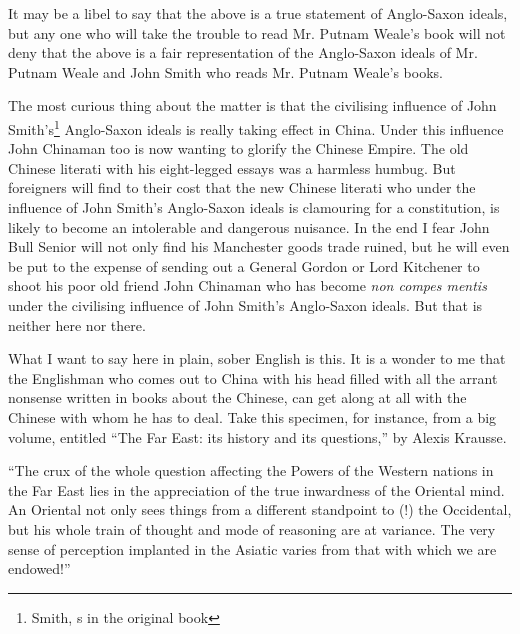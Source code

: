 It may be a libel to say that the above is a true statement of Anglo-Saxon ideals, but any one who will take the trouble to read Mr. Putnam Weale's book will not deny that the above is a fair representation of the Anglo-Saxon ideals of Mr. Putnam Weale and John Smith who reads Mr. Putnam Weale's books.

The most curious thing about the matter is that the civilising influence of John Smith's\footnote{Smith, s in the original book} Anglo-Saxon ideals is really taking effect in China.
Under this influence John Chinaman too is now wanting to glorify the Chinese Empire.
The old Chinese literati with his eight-legged essays was a harmless humbug.
But foreigners will find to their cost that the new Chinese literati who under the influence of John Smith's Anglo-Saxon ideals is clamouring for a constitution, is likely to become an intolerable and dangerous nuisance.
In the end I fear John Bull Senior will not only find his Manchester goods trade ruined, but he will even be put to the expense of sending out a General Gordon or Lord Kitchener to shoot his poor old friend John Chinaman who has become \emph{non compes mentis} under the civilising influence of John Smith's Anglo-Saxon ideals.
But that is neither here nor there.

What I want to say here in plain, sober English is this.
It is a wonder to me that the Englishman who comes out to China with his head filled with all the arrant nonsense written in books about the Chinese, can get along at all with the Chinese with whom he has to deal.
Take this specimen, for instance, from a big volume, entitled ``The Far East: its history and its questions,'' by Alexis Krausse.

``The crux of the whole question affecting the Powers of the Western nations in the Far East lies in the appreciation of the true inwardness of the Oriental mind.
An Oriental not only sees things from a different standpoint to (!) the Occidental, but his whole train of thought and mode of reasoning are at variance.
The very sense of perception implanted in the Asiatic varies from that with which we are endowed!''


